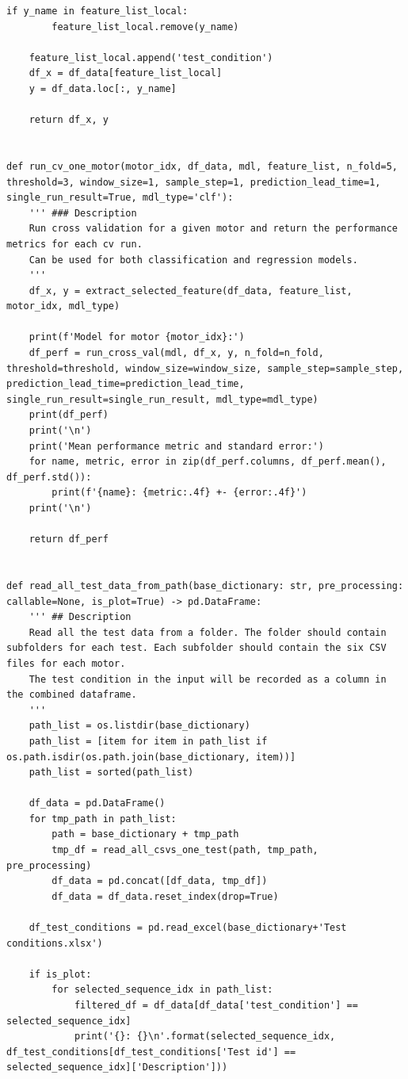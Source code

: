 \documentclass[11pt,a4paper]{article}
\begin{document}
\begin{lstlisting}[style=pyfull]
    if y_name in feature_list_local:
        feature_list_local.remove(y_name)

    feature_list_local.append('test_condition')
    df_x = df_data[feature_list_local]
    y = df_data.loc[:, y_name]

    return df_x, y


def run_cv_one_motor(motor_idx, df_data, mdl, feature_list, n_fold=5, threshold=3, window_size=1, sample_step=1, prediction_lead_time=1, single_run_result=True, mdl_type='clf'):
    ''' ### Description
    Run cross validation for a given motor and return the performance metrics for each cv run.
    Can be used for both classification and regression models.
    '''
    df_x, y = extract_selected_feature(df_data, feature_list, motor_idx, mdl_type)

    print(f'Model for motor {motor_idx}:')
    df_perf = run_cross_val(mdl, df_x, y, n_fold=n_fold, threshold=threshold, window_size=window_size, sample_step=sample_step, prediction_lead_time=prediction_lead_time, single_run_result=single_run_result, mdl_type=mdl_type)
    print(df_perf)
    print('\n')
    print('Mean performance metric and standard error:')
    for name, metric, error in zip(df_perf.columns, df_perf.mean(), df_perf.std()):
        print(f'{name}: {metric:.4f} +- {error:.4f}')
    print('\n')

    return df_perf


def read_all_test_data_from_path(base_dictionary: str, pre_processing: callable=None, is_plot=True) -> pd.DataFrame:
    ''' ## Description
    Read all the test data from a folder. The folder should contain subfolders for each test. Each subfolder should contain the six CSV files for each motor.
    The test condition in the input will be recorded as a column in the combined dataframe.
    '''
    path_list = os.listdir(base_dictionary)
    path_list = [item for item in path_list if os.path.isdir(os.path.join(base_dictionary, item))]
    path_list = sorted(path_list)

    df_data = pd.DataFrame()
    for tmp_path in path_list:
        path = base_dictionary + tmp_path
        tmp_df = read_all_csvs_one_test(path, tmp_path, pre_processing)
        df_data = pd.concat([df_data, tmp_df])
        df_data = df_data.reset_index(drop=True)

    df_test_conditions = pd.read_excel(base_dictionary+'Test conditions.xlsx')

    if is_plot:
        for selected_sequence_idx in path_list:
            filtered_df = df_data[df_data['test_condition'] == selected_sequence_idx]
            print('{}: {}\n'.format(selected_sequence_idx, df_test_conditions[df_test_conditions['Test id'] == selected_sequence_idx]['Description']))


\end{lstlisting}
\end{document}
